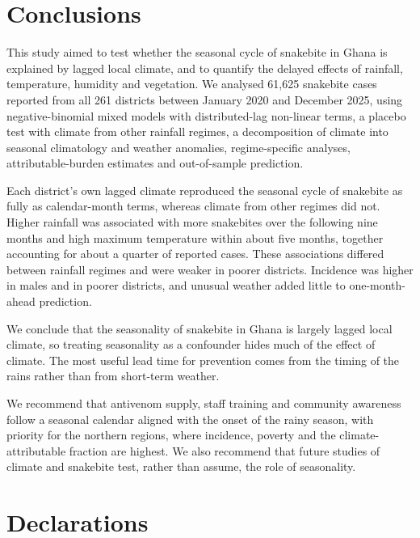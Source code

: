 \documentclass[11pt,a4paper]{article}
\begin{document}
\section{Conclusions}

This study aimed to test whether the seasonal cycle of snakebite in Ghana is explained by lagged local climate, and to quantify the delayed effects of rainfall, temperature, humidity and vegetation. We analysed 61,625 snakebite cases reported from all 261 districts between January 2020 and December 2025, using negative-binomial mixed models with distributed-lag non-linear terms, a placebo test with climate from other rainfall regimes, a decomposition of climate into seasonal climatology and weather anomalies, regime-specific analyses, attributable-burden estimates and out-of-sample prediction.

Each district's own lagged climate reproduced the seasonal cycle of snakebite as fully as calendar-month terms, whereas climate from other regimes did not. Higher rainfall was associated with more snakebites over the following nine months and high maximum temperature within about five months, together accounting for about a quarter of reported cases. These associations differed between rainfall regimes and were weaker in poorer districts. Incidence was higher in males and in poorer districts, and unusual weather added little to one-month-ahead prediction.

We conclude that the seasonality of snakebite in Ghana is largely lagged local climate, so treating seasonality as a confounder hides much of the effect of climate. The most useful lead time for prevention comes from the timing of the rains rather than from short-term weather.

We recommend that antivenom supply, staff training and community awareness follow a seasonal calendar aligned with the onset of the rainy season, with priority for the northern regions, where incidence, poverty and the climate-attributable fraction are highest. We also recommend that future studies of climate and snakebite test, rather than assume, the role of seasonality.

\section*{Declarations}
\end{document}
